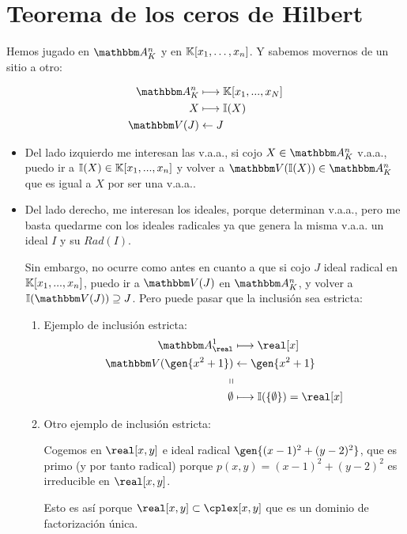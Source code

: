 \chapter{Teorema de los ceros de Hilbert}

Hemos jugado en $\Akn$ y en $\mathbb{K}[x_1,\dotsc,x_n]$. Y sabemos movernos de un sitio a otro:

\begin{align*}
	\Akn & \longmapsto  \K[x_1,...,x_N] \\
	X & \longmapsto  \I(X) \\
	\V(J) & \leftarrow  J \\
\end{align*}

\begin{itemize}
	\item Del lado izquierdo me interesan las v.a.a., si cojo $X\in \Akn$ v.a.a., puedo ir a $\mathbb{I}(X) \in \mathbb{K}[x_1,...,x_n]$ y volver a $\V(\I(X)) \in \Akn$ que es igual a $X$ por ser una v.a.a..

	\item Del lado derecho, me interesan los ideales, porque determinan v.a.a., pero me basta quedarme con los ideales radicales ya que genera la misma v.a.a. un ideal $I$ y su $Rad(I)$.

	Sin embargo, no ocurre como antes en cuanto a que si cojo $J$ ideal radical en $\mathbb{K}[x_1,...,x_n]$, puedo ir a $\V(J)$ en $\Akn$, y volver a $\I(\V(J)) \supseteq J$. Pero puede pasar que la inclusión sea estricta:
	\begin{example}
		\begin{enumerate}
			\item Ejemplo de inclusión estricta:
			\begin{align*}
				\A^1_{\real} & \longmapsto  \real[x] \\
				\V(\gen{x^2+1}) & \leftarrow  \gen{x^2+1} \\
				\shortparallel & \\
				\emptyset & \longmapsto  \I(\{ \emptyset \})=\real[x] \\
			\end{align*}
			\item Otro ejemplo de inclusión estricta:

			Cogemos en $\real[x,y]$ e ideal  radical $\gen{(x-1)^2+(y-2)^2}$, que es primo (y por tanto radical) porque $p(x,y)=(x-1)^2+(y-2)^2$ es irreducible en $\real[x,y]$.

			Esto es así porque $\real[x,y] \subset \cplex[x,y]$  que es un dominio de factorización única.


\end{enumerate}
\end{example}
\end{itemize}
